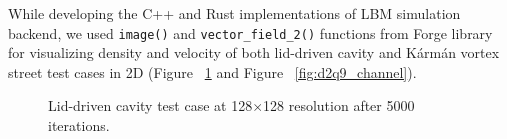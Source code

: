 While developing the C++ and Rust implementations of LBM simulation backend, we used \texttt{image()} and \texttt{vector_field_2()} functions from Forge library for visualizing density and velocity of both lid-driven cavity and Kármán vortex street test cases in 2D (Figure~ \ref{fig:d2q9_lid} and Figure~ \ref{fig:d2q9_channel}).

\begin{figure}[!ht]
	\centering
	\qquad
	\captionsetup{justification=centering}
	\caption{Lid-driven cavity test case at 128$\times$128 resolution after 5000 iterations.}
	\label{fig:d2q9_lid}
\end{figure}

